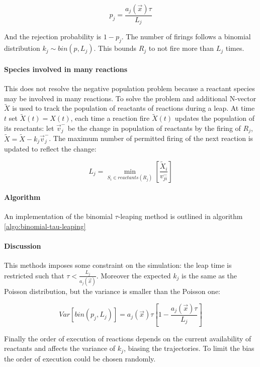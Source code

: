       $$p_j = \frac{a_j(\vec{x})\tau}{L_j}$$

      And the rejection probability is $1-p_j$.
      The number of firings follows a binomial distribution $k_j\sim bin(p, L_j)$.
      This bounds $R_j$ to not fire more than $L_j$ times.

      \paragraph{Species involved in many reactions}
      This does not resolve the negative population problem because a reactant species may be involved in many reactions.
      To solve the problem and additional N-vector $\tilde{X}$ is used to track the population of reactants of reactions during a leap.
      At time $t$ set $\tilde{X}(t) = X(t)$, each time a reaction fire $\tilde{X}(t)$ updates the population of its reactants: let $\vec{v}_j^-$ be the change in population of reactants by the firing of $R_j$, $\tilde{X} = \tilde{X}-k_j\vec{v}_j^-$.
      The maximum number of permitted firing of the next reaction is updated to reflect the change:

      $$L_j = \min\limits_{S_i\in reactants(R_j)}\left[\frac{\tilde{X}_i}{v_{ji}^-}\right]$$

      \paragraph{Algorithm}
      An implementation of the binomial $\tau$-leaping method is outlined in algorithm \ref{algo:binomial-tau-leaping}

      

      \paragraph{Discussion}
      This methods imposes some constraint on the simulation: the leap time is restricted such that $\tau<\frac{L_j}{a_j(\vec{x})}$.
      Moreover the expected $k_j$ is the same as the Poisson distribution, but the variance is smaller than the Poisson one:

      $$Var[bin(p_j, L_j)] = a_j(\vec{x})\tau\left[1-\frac{a_j(\vec{x})\tau}{L_j}\right]$$

      Finally the order of execution of reactions depends on the current availability of reactants and affects the variance of $k_j$, biasing the trajectories.
      To limit the bias the order of execution could be chosen randomly.

